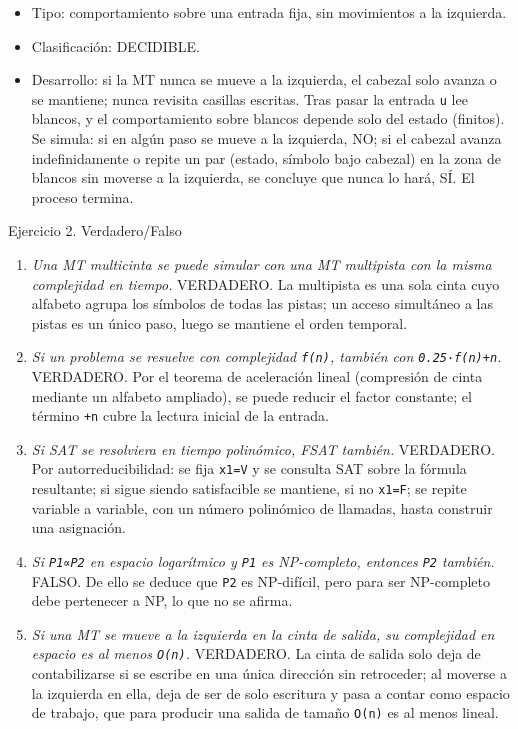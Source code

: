 \documentclass[12pt]{book} %
\providecommand{\tightlist}{%
  \setlength{\itemsep}{0pt}\setlength{\parskip}{0pt}}
\begin{document}
\begin{enumerate}
  \begin{itemize}
  \tightlist
  \item
    Tipo: comportamiento sobre una entrada fija, sin movimientos a la
    izquierda.
  \item
    Clasificación: DECIDIBLE.
  \item
    Desarrollo: si la MT nunca se mueve a la izquierda, el cabezal solo
    avanza o se mantiene; nunca revisita casillas escritas. Tras pasar
    la entrada \texttt{u} lee blancos, y el comportamiento sobre blancos
    depende solo del estado (finitos). Se simula: si en algún paso se
    mueve a la izquierda, NO; si el cabezal avanza indefinidamente o
    repite un par (estado, símbolo bajo cabezal) en la zona de blancos
    sin moverse a la izquierda, se concluye que nunca lo hará, SÍ. El
    proceso termina.
  \end{itemize}
\end{enumerate}

Ejercicio 2. Verdadero/Falso

\begin{enumerate}
\def\labelenumi{\arabic{enumi}.}
\tightlist
\item
  \emph{Una MT multicinta se puede simular con una MT multipista con la
  misma complejidad en tiempo.} VERDADERO. La multipista es una sola
  cinta cuyo alfabeto agrupa los símbolos de todas las pistas; un acceso
  simultáneo a las pistas es un único paso, luego se mantiene el orden
  temporal.
\item
  \emph{Si un problema se resuelve con complejidad \texttt{f(n)},
  también con \texttt{0.25·f(n)+n}.} VERDADERO. Por el teorema de
  aceleración lineal (compresión de cinta mediante un alfabeto
  ampliado), se puede reducir el factor constante; el término
  \texttt{+n} cubre la lectura inicial de la entrada.
\item
  \emph{Si SAT se resolviera en tiempo polinómico, FSAT también.}
  VERDADERO. Por autorreducibilidad: se fija \texttt{x1=V} y se consulta
  SAT sobre la fórmula resultante; si sigue siendo satisfacible se
  mantiene, si no \texttt{x1=F}; se repite variable a variable, con un
  número polinómico de llamadas, hasta construir una asignación.
\item
  \emph{Si \texttt{P1∝P2} en espacio logarítmico y \texttt{P1} es
  NP-completo, entonces \texttt{P2} también.} FALSO. De ello se deduce
  que \texttt{P2} es NP-difícil, pero para ser NP-completo debe
  pertenecer a NP, lo que no se afirma.
\item
  \emph{Si una MT se mueve a la izquierda en la cinta de salida, su
  complejidad en espacio es al menos \texttt{O(n)}.} VERDADERO. La cinta
  de salida solo deja de contabilizarse si se escribe en una única
  dirección sin retroceder; al moverse a la izquierda en ella, deja de
  ser de solo escritura y pasa a contar como espacio de trabajo, que
  para producir una salida de tamaño \texttt{O(n)} es al menos lineal.
\end{enumerate}
\end{document}
